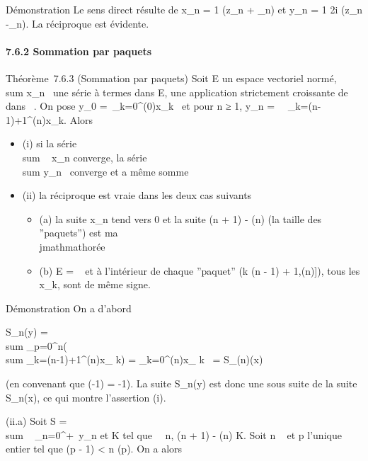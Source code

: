 \documentclass[]{article}
\begin{document}
Démonstration Le sens direct résulte de x_n = 1
 (z_n +
\overlinez_n) et y_n = 1
\over 2i (z_n
-\overlinez_n). La réciproque est évidente.

\paragraph{7.6.2 Sommation par paquets}

Théorème~7.6.3 (Sommation par paquets) Soit E un espace vectoriel normé,
\\sum  x_n~ une
série à termes dans E, \phi une application strictement croissante de ~
dans ~. On pose y_0 =\
\sum  _k=0^\phi(0)x_k~ et
pour n ≥ 1, y_n =\
\sum ~
_k=\phi(n-1)+1^\phi(n)x_k. Alors

\begin{itemize}
\itemsep1pt\parskip0pt
\item
  (i) si la série \\sum ~
  x_n converge, la série
  \\sum  y_n~
  converge et a même somme
\item
  (ii) la réciproque est vraie dans les deux cas suivants

  \begin{itemize}
  \itemsep1pt\parskip0pt
  \item
    (a) la suite x_n tend vers 0 et la suite \phi(n + 1) - \phi(n)
    (la taille des ''paquets'') est ma\\jmathmathorée
  \item
    (b) E = ~ et à l'intérieur de chaque ''paquet'' (k \in {[}\phi(n - 1) +
    1,\phi(n){]}), tous les x_k, sont de même signe.
  \end{itemize}
\end{itemize}

Démonstration On a d'abord

S_n(y) = \\sum
_p=0^n(\\sum
_k=\phi(n-1)+1^\phi(n)x_ k) =
\sum _k=0^\phi(n)x_ k~ =
S_\phi(n)(x)

(en convenant que \phi(-1) = -1). La suite S_n(y) est donc une
sous suite de la suite S_n(x), ce qui montre l'assertion (i).

(ii.a) Soit S = \\sum ~
_n=0^+\infty~y_n et K tel que
\forall~~n, \phi(n + 1) - \phi(n) \leq K. Soit n \in {}~ et p
l'unique entier tel que \phi(p - 1) \textless{} n \leq \phi(p). On a alors
\end{document}
